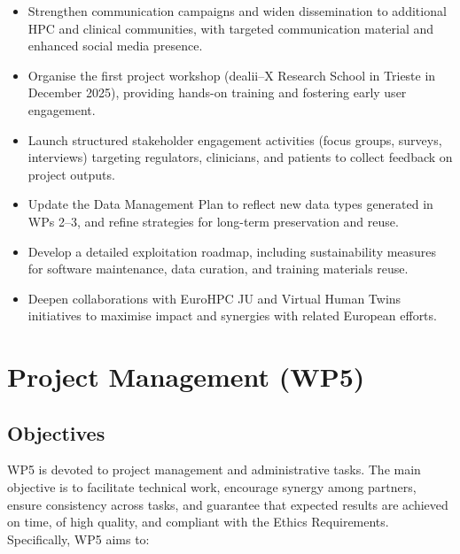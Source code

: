 \documentclass[a4paper,12pt, numbers]{article}
\begin{document}
\begin{itemize}[left=1em, itemsep=0pt, topsep=0pt]
\item Strengthen communication campaigns and widen dissemination to additional HPC and clinical communities, with targeted communication material and enhanced social media presence.
\item Organise the first project workshop (dealii--X Research School in Trieste in December 2025), providing hands-on training and fostering early user engagement.
\item Launch structured stakeholder engagement activities (focus groups, surveys, interviews) targeting regulators, clinicians, and patients to collect feedback on project outputs.
\item Update the Data Management Plan to reflect new data types generated in WPs 2–3, and refine strategies for long-term preservation and reuse.
\item Develop a detailed exploitation roadmap, including sustainability measures for software maintenance, data curation, and training materials reuse.
\item Deepen collaborations with EuroHPC JU and Virtual Human Twins initiatives to maximise impact and synergies with related European efforts.
\end{itemize}






\newpage

\section{{Project Management (WP5)}}
\label{sec:wp5_management}

\subsection{Objectives}

WP5 is devoted to project management and administrative tasks. The main objective is to facilitate technical work, encourage synergy among partners, ensure consistency across tasks, and guarantee that expected results are achieved on time, of high quality, and compliant with the Ethics Requirements. Specifically, WP5 aims to:
\end{document}
